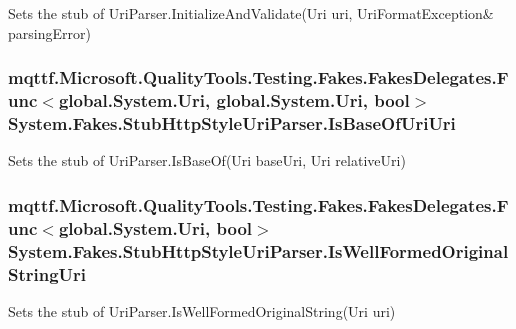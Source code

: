 Sets the stub of Uri\-Parser.\-Initialize\-And\-Validate(Uri uri, Uri\-Format\-Exception\& parsing\-Error)

\hypertarget{class_system_1_1_fakes_1_1_stub_http_style_uri_parser_a5d0c55fd42218870625728f70e5bc7df}{
\subsubsection[{Is\-Base\-Of\-Uri\-Uri}]{\setlength{\rightskip}{0pt plus 5cm}mqttf.\-Microsoft.\-Quality\-Tools.\-Testing.\-Fakes.\-Fakes\-Delegates.\-Func$<$global.\-System.\-Uri, global.\-System.\-Uri, bool$>$ System.\-Fakes.\-Stub\-Http\-Style\-Uri\-Parser.\-Is\-Base\-Of\-Uri\-Uri}}\label{class_system_1_1_fakes_1_1_stub_http_style_uri_parser_a5d0c55fd42218870625728f70e5bc7df}


Sets the stub of Uri\-Parser.\-Is\-Base\-Of(\-Uri base\-Uri, Uri relative\-Uri)

\hypertarget{class_system_1_1_fakes_1_1_stub_http_style_uri_parser_a52fe8de026663e2fb708a73fc9d67792}{
\subsubsection[{Is\-Well\-Formed\-Original\-String\-Uri}]{\setlength{\rightskip}{0pt plus 5cm}mqttf.\-Microsoft.\-Quality\-Tools.\-Testing.\-Fakes.\-Fakes\-Delegates.\-Func$<$global.\-System.\-Uri, bool$>$ System.\-Fakes.\-Stub\-Http\-Style\-Uri\-Parser.\-Is\-Well\-Formed\-Original\-String\-Uri}}\label{class_system_1_1_fakes_1_1_stub_http_style_uri_parser_a52fe8de026663e2fb708a73fc9d67792}


Sets the stub of Uri\-Parser.\-Is\-Well\-Formed\-Original\-String(\-Uri uri)

